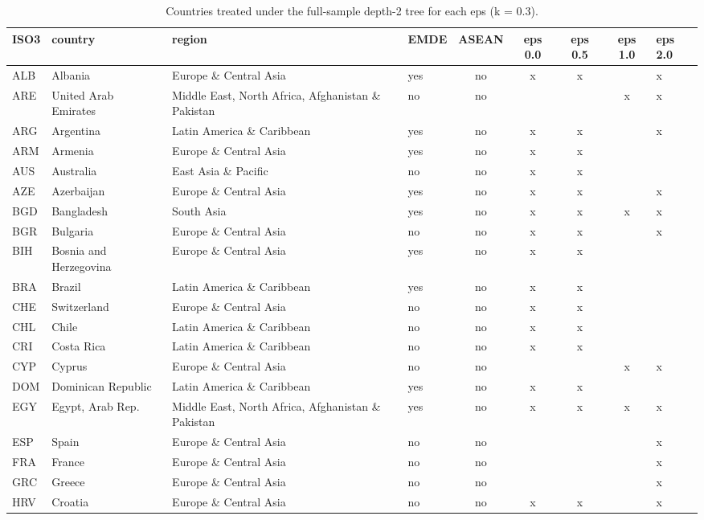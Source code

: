 \begin{table}[htbp]
\centering
\caption{Countries treated under the full-sample depth-2 tree for each eps (k = 0.3).}
\label{tab:treated}
\begin{tabular}{llllcccc}
\toprule
ISO3 & country & region & EMDE & ASEAN & eps 0.0 & eps 0.5 & eps 1.0 & eps 2.0 \\
\midrule
ALB & Albania & Europe \& Central Asia & yes & no & x & x &  & x \\
ARE & United Arab Emirates & Middle East, North Africa, Afghanistan \& Pakistan & no & no &  &  & x & x \\
ARG & Argentina & Latin America \& Caribbean & yes & no & x & x &  & x \\
ARM & Armenia & Europe \& Central Asia & yes & no & x & x &  &  \\
AUS & Australia & East Asia \& Pacific & no & no & x & x &  &  \\
AZE & Azerbaijan & Europe \& Central Asia & yes & no & x & x &  & x \\
BGD & Bangladesh & South Asia & yes & no & x & x & x & x \\
BGR & Bulgaria & Europe \& Central Asia & no & no & x & x &  & x \\
BIH & Bosnia and Herzegovina & Europe \& Central Asia & yes & no & x & x &  &  \\
BRA & Brazil & Latin America \& Caribbean & yes & no & x & x &  &  \\
CHE & Switzerland & Europe \& Central Asia & no & no & x & x &  &  \\
CHL & Chile & Latin America \& Caribbean & no & no & x & x &  &  \\
CRI & Costa Rica & Latin America \& Caribbean & no & no & x & x &  &  \\
CYP & Cyprus & Europe \& Central Asia & no & no &  &  & x & x \\
DOM & Dominican Republic & Latin America \& Caribbean & yes & no & x & x &  &  \\
EGY & Egypt, Arab Rep. & Middle East, North Africa, Afghanistan \& Pakistan & yes & no & x & x & x & x \\
ESP & Spain & Europe \& Central Asia & no & no &  &  &  & x \\
FRA & France & Europe \& Central Asia & no & no &  &  &  & x \\
GRC & Greece & Europe \& Central Asia & no & no &  &  &  & x \\
HRV & Croatia & Europe \& Central Asia & no & no & x & x &  & x \\

\end{tabular}
\end{table}
